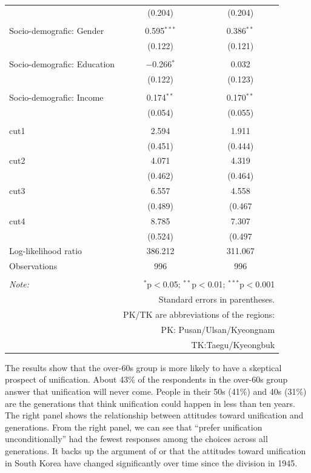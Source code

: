 \documentclass[letterpaper,9pt,twocolumn,twoside,]{pinp}
\begin{document}
\begin{table}[H]
\begin{tabular}{@{\extracolsep{5pt}}lcc}
  & (0.204) & (0.204) \\ 
  & & \\ 
 Socio-demografic: Gender & 0.595$^{***}$ & 0.386$^{**}$ \\ 
  & (0.122) & (0.121) \\ 
  & & \\ 
 Socio-demografic: Education & $-$0.266$^{*}$ & 0.032 \\ 
  & (0.122) & (0.123) \\ 
  & & \\ 
 Socio-demografic: Income & 0.174$^{**}$ & 0.170$^{**}$ \\ 
  & (0.054) & (0.055) \\ 
  & & \\ 
cut1 & 2.594 & 1.911 \\ 
 & (0.451) & (0.444) \\ 
cut2 & 4.071 & 4.319 \\ 
 & (0.462) & (0.464) \\ 
cut3 & 6.557 & 4.558 \\ 
 & (0.489) & (0.467 \\ 
cut4 & 8.785 & 7.307 \\ 
 & (0.524) & (0.497 \\ 
Log-likelihood ratio & 386.212 & 311.067 \\ 
Observations & 996 & 996 \\ 
\hline \\[-1.8ex] 
\textit{Note:}  & \multicolumn{2}{r}{$^{*}$p$<$0.05; $^{**}$p$<$0.01; $^{***}$p$<$0.001} \\ 
 & \multicolumn{2}{r}{Standard errors in parentheses.} \\ 
 & \multicolumn{2}{r}{PK/TK are abbreviations of the regions:} \\ 
 & \multicolumn{2}{r}{PK: Pusan/Ulsan/Kyeongnam} \\ 
 & \multicolumn{2}{r}{TK:Taegu/Kyeongbuk} \\ 
\end{tabular} 
\end{table}

The results show that the over-60s group is more likely to have a
skeptical prospect of unification. About 43\% of the respondents in the
over-60s group answer that unification will never come. People in their
50s (41\%) and 40s (31\%) are the generations that think unification
could happen in less than ten years. The right panel shows the
relationship between attitudes toward unification and generations. From
the right panel, we can see that ``prefer unification unconditionally''
had the fewest responses among the choices across all generations. It
backs up the argument of \citet{ChoHan2014} or \citet{Choi2016} that the
attitudes toward unification in South Korea have changed significantly
over time since the division in 1945.
\end{document}

